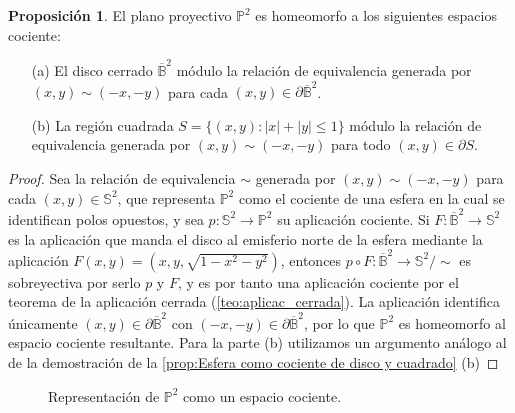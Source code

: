 \documentclass[10pt]{report}
\theoremstyle{definition}
\newtheorem{prop}[defin]{Proposición}
\begin{document}
\begin{prop}%
\label{prop:proyectivo_cociente_cuadrado}
El plano proyectivo $\mathbb{P}^2$ es homeomorfo a los siguientes espacios cociente:
\begin{itemize}
\item[(a)] El disco cerrado $\overline{\mathbb{B}}^2$ módulo la relación de equivalencia generada por $(x,y) \sim (-x,-y)$ para cada $(x,y)\in \partial \overline{\mathbb{B}}^2$.
\item[(b)] La región cuadrada $S=\{(x,y):|x|+|y|\leq 1\} $ módulo la relación de equivalencia generada por $(x,y)\sim (-x,-y) $ para todo $(x,y)\in \partial S$.
\end{itemize}
\end{prop}
\begin{proof}
Sea la relación de equivalencia $\sim$ generada por $(x,y) \sim (-x,-y)$ para cada $(x,y)\in \mathbb{S}^2$, que representa $\mathbb{P}^2$ como el cociente de una esfera en la cual se identifican polos opuestos, y sea $p:\mathbb{S}^2 \to \mathbb{P}^2$ su aplicación cociente. %
Si $F:\overline{\mathbb{B}}^2 \to \mathbb{S}^2$ es la aplicación que manda el disco al emisferio norte de la esfera mediante la aplicación $F(x,y)=(x,y,\sqrt{1-x^2-y^2})$, entonces $p\circ F:\overline{\mathbb{B}}^2 \to \mathbb{S}^2/\sim$ es sobreyectiva por serlo $p$ y $F$, y es por tanto una aplicación cociente por el teorema de la aplicación cerrada (\autoref{teo:aplicac_cerrada}). La aplicación identifica únicamente $(x,y)\in \partial \overline{\mathbb{B}}^2$ con $(-x,-y)\in \partial \overline{\mathbb{B}}^2$, por lo que $\mathbb{P}^2$ es homeomorfo al espacio cociente resultante.
Para la parte (b) utilizamos un argumento análogo al de la demostración de la \autoref{prop:Esfera como cociente de disco y cuadrado} (b) 
\end{proof}


\begin{figure}[h]%
\begin{center}
\caption{Representación de $\mathbb{P}^2$ como un espacio cociente.\label{fig:plano_proyectivo_cuadrado}}
\end{center}
\end{figure}
\end{document}
